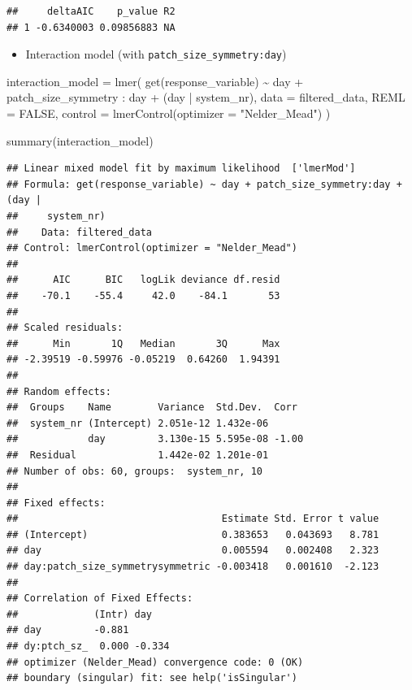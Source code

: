 \documentclass[
]{article}
\newenvironment{Shaded}{\begin{snugshade}}{\end{snugshade}}
\newcommand{\AttributeTok}[1]{\textcolor[rgb]{0.77,0.63,0.00}{#1}}
\newcommand{\ConstantTok}[1]{\textcolor[rgb]{0.00,0.00,0.00}{#1}}
\newcommand{\FunctionTok}[1]{\textcolor[rgb]{0.00,0.00,0.00}{#1}}
\newcommand{\NormalTok}[1]{#1}
\newcommand{\OtherTok}[1]{\textcolor[rgb]{0.56,0.35,0.01}{#1}}
\newcommand{\SpecialCharTok}[1]{\textcolor[rgb]{0.00,0.00,0.00}{#1}}
\newcommand{\StringTok}[1]{\textcolor[rgb]{0.31,0.60,0.02}{#1}}
\providecommand{\tightlist}{%
  \setlength{\itemsep}{0pt}\setlength{\parskip}{0pt}}
\begin{document}
\begin{verbatim}
##     deltaAIC    p_value R2
## 1 -0.6340003 0.09856883 NA
\end{verbatim}

\begin{itemize}
\tightlist
\item
  Interaction model (with \texttt{patch\_size\_symmetry:day})
\end{itemize}

\begin{Shaded}
\begin{Highlighting}[]
\NormalTok{interaction\_model }\OtherTok{=} \FunctionTok{lmer}\NormalTok{(}
  \FunctionTok{get}\NormalTok{(response\_variable) }\SpecialCharTok{\textasciitilde{}}
\NormalTok{    day }\SpecialCharTok{+} 
\NormalTok{    patch\_size\_symmetry }\SpecialCharTok{:}\NormalTok{ day }\SpecialCharTok{+} 
\NormalTok{    (day }\SpecialCharTok{|}\NormalTok{ system\_nr), }
  \AttributeTok{data =}\NormalTok{ filtered\_data,}
  \AttributeTok{REML =} \ConstantTok{FALSE}\NormalTok{,}
  \AttributeTok{control =} \FunctionTok{lmerControl}\NormalTok{(}\AttributeTok{optimizer =} \StringTok{"Nelder\_Mead"}\NormalTok{)}
\NormalTok{)}

\FunctionTok{summary}\NormalTok{(interaction\_model)}
\end{Highlighting}
\end{Shaded}

\begin{verbatim}
## Linear mixed model fit by maximum likelihood  ['lmerMod']
## Formula: get(response_variable) ~ day + patch_size_symmetry:day + (day |  
##     system_nr)
##    Data: filtered_data
## Control: lmerControl(optimizer = "Nelder_Mead")
## 
##      AIC      BIC   logLik deviance df.resid 
##    -70.1    -55.4     42.0    -84.1       53 
## 
## Scaled residuals: 
##      Min       1Q   Median       3Q      Max 
## -2.39519 -0.59976 -0.05219  0.64260  1.94391 
## 
## Random effects:
##  Groups    Name        Variance  Std.Dev.  Corr 
##  system_nr (Intercept) 2.051e-12 1.432e-06      
##            day         3.130e-15 5.595e-08 -1.00
##  Residual              1.442e-02 1.201e-01      
## Number of obs: 60, groups:  system_nr, 10
## 
## Fixed effects:
##                                   Estimate Std. Error t value
## (Intercept)                       0.383653   0.043693   8.781
## day                               0.005594   0.002408   2.323
## day:patch_size_symmetrysymmetric -0.003418   0.001610  -2.123
## 
## Correlation of Fixed Effects:
##             (Intr) day   
## day         -0.881       
## dy:ptch_sz_  0.000 -0.334
## optimizer (Nelder_Mead) convergence code: 0 (OK)
## boundary (singular) fit: see help('isSingular')
\end{verbatim}
\end{document}
